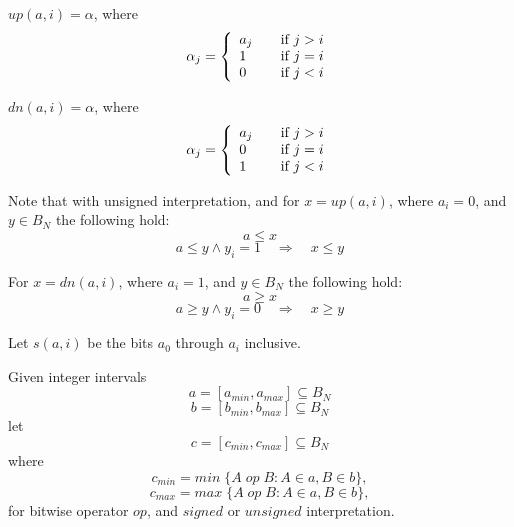 \documentclass{article}
\begin{document}
$up(a,i) = \alpha$, where
\begin{equation*}
    \alpha_j = \left\{
    \begin{array}{l l}
    a_j & \quad \text{if $j > i$}\\
    1 & \quad \text{if $j = i$}\\
    0 & \quad \text{if $j < i$}\\
    \end{array}\right.
\end{equation*}

$dn(a,i) = \alpha$, where
\begin{equation*}
    \alpha_j = \left\{
    \begin{array}{l l}
    a_j & \quad \text{if $j > i$}\\
    0 & \quad \text{if $j = i$}\\
    1 & \quad \text{if $j < i$}\\
    \end{array}\right.
\end{equation*}

Note that with unsigned interpretation, and 
for $x = up(a,i)$, where $a_i = 0$, and $y \in B_N$ the following hold:
\begin{equation*}
a \le x
\end{equation*}
\begin{equation*}
a \le y \wedge y_i = 1 \quad \Rightarrow \quad x \le y
\end{equation*}

For $x = dn(a,i)$, where $a_i = 1$, and $y \in B_N$ the following hold:
\begin{equation*}
a \ge x
\end{equation*}
\begin{equation*}
a \ge y \wedge y_i = 0 \quad \Rightarrow \quad x \ge y
\end{equation*}

Let $s(a,i)$ be the bits $a_{0}$ through $a_{i}$ inclusive.

Given integer intervals 
\begin{equation*}
a = [a_{min},a_{max}] \subseteq B_N
\end{equation*} 
\begin{equation*}
b = [b_{min},b_{max}] \subseteq B_N
\end{equation*} 
let
\begin{equation*}
c = [c_{min},c_{max}] \subseteq B_N
\end{equation*} 
where
\begin{equation*}c_{min} = min \; \{A \; op \; B :A \in a, B \in b\},\end{equation*} 
\begin{equation*}c_{max} = max \; \{A \; op \; B :A \in a, B \in b\}, \end{equation*}
for bitwise operator $op$, and $signed$ or $unsigned$ interpretation.
\end{document}
